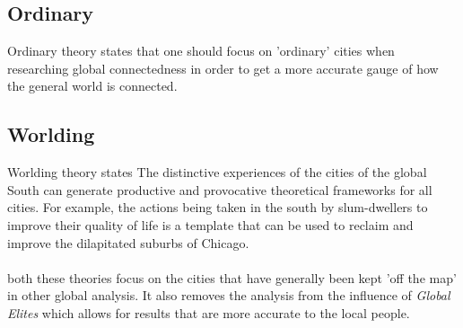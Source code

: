 \documentclass[12pt]{book}
\begin{document}
\subsection*{Ordinary}
Ordinary theory states that one should focus on 'ordinary' cities when researching global connectedness in order to get a more
        accurate gauge of how the general world is connected.

\subsection*{Worlding}
Worlding theory states The distinctive experiences of the cities of the global South can generate productive
        and provocative theoretical frameworks for all cities. 
For example, the actions being taken in the south by slum-dwellers to improve their quality of life is a template that can be 
        used to reclaim and improve the dilapitated suburbs of Chicago.

\paragraph{}
both these theories focus on the cities that have generally been kept 'off the map' in other global analysis.
It also removes the analysis from the influence of \textit{Global Elites} which allows for results that are more accurate
        to the local people.
\end{document}
